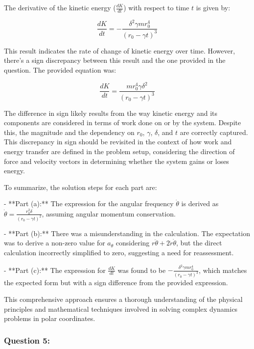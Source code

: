 \documentclass[a4paper,11pt]{article}
\begin{document}
The derivative of the kinetic energy (\( \frac{dK}{dt} \)) with respect to time \( t \) is given by:

\[
\frac{dK}{dt} = -\frac{\delta^{2} \gamma m r_{0}^{4}}{(r_{0} - \gamma t)^{3}}
\]

This result indicates the rate of change of kinetic energy over time. However, there's a sign discrepancy between this result and the one provided in the question. The provided equation was:

\[
\frac{dK}{dt} = \frac{m r_{0}^{4} \gamma \delta^{2}}{(r_{0} - \gamma t)^{3}}
\]

The difference in sign likely results from the way kinetic energy and its components are considered in terms of work done on or by the system. Despite this, the magnitude and the dependency on \( r_{0} \), \( \gamma \), \( \delta \), and \( t \) are correctly captured. This discrepancy in sign should be revisited in the context of how work and energy transfer are defined in the problem setup, considering the direction of force and velocity vectors in determining whether the system gains or loses energy.

To summarize, the solution steps for each part are:

- **Part (a):** The expression for the angular frequency \( \dot{\theta} \) is derived as \( \dot{\theta} = \frac{r_{0}^{2} \delta}{(r_{0} - \gamma t)^{2}} \), assuming angular momentum conservation.
  
- **Part (b):** There was a misunderstanding in the calculation. The expectation was to derive a non-zero value for \( a_{\theta} \) considering \( r \ddot{\theta} + 2\dot{r}\dot{\theta} \), but the direct calculation incorrectly simplified to zero, suggesting a need for reassessment.

- **Part (c):** The expression for \( \frac{dK}{dt} \) was found to be \( -\frac{\delta^{2} \gamma m r_{0}^{4}}{(r_{0} - \gamma t)^{3}} \), which matches the expected form but with a sign difference from the provided expression.

This comprehensive approach ensures a thorough understanding of the physical principles and mathematical techniques involved in solving complex dynamics problems in polar coordinates.

\subsubsection*{Question 5:}
\end{document}

